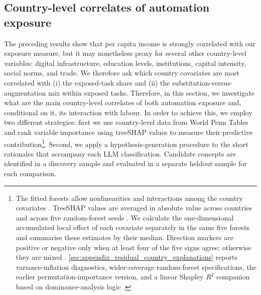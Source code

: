 \documentclass[11pt]{article}
\begin{document}
\FloatBarrier
\subsection{Country-level correlates of automation exposure}
\label{sec:results_country_predictors}


The preceding results show that per capita income is strongly correlated with our exposure measure, but it may nonetheless proxy for several other country-level variables: digital infrastructure, education levels, institutions, capital intensity, social norms, and trade. We therefore ask which country covariates are most correlated with (i) the exposed-task share and (ii) the substitution-versus-augmentation mix within exposed tasks. Therefore, in this section, we investigate what are the main country-level correlates of both automation exposure and, conditional on it, its interaction with labour. In order to achieve this, we employ two different strategies: first we use country-level data from World Penn Tables \citep{FeenstraInklaarTimmer2015PWT} and rank variable importance using treeSHAP values \citep{LundbergLee2017SHAP,LundbergEtAl2020TreeSHAP} to measure their predictive contribution\footnote{The fitted forests allow nonlinearities and interactions among the country covariates \citep{Breiman2001RandomForests}. TreeSHAP values are averaged in absolute value across countries and across five random-forest seeds \citep{LundbergLee2017SHAP,LundbergEtAl2020TreeSHAP}. We calculate the one-dimensional accumulated local effect of each covariate separately in the same five forests and summarise these estimates by their median. Direction markers are positive or negative only when at least four of the five signs agree; otherwise they are mixed \citep{ApleyZhu2020ALE}. \ref{sec:appendix_residual_country_explanations} reports variance-inflation diagnostics, wider-coverage random-forest specifications, the earlier permutation-importance version, and a linear Shapley $R^2$ companion based on dominance-analysis logic \citep{Budescu1993DominanceAnalysis}.}. Second, we apply a hypothesis-generation procedure \citep{GentzkowKellyTaddy2019,LudwigMullainathan2024HypothesisGeneration,MovvaEtAl2025HypotheSAEs} to the short rationales that accompany each LLM classification. Candidate concepts are identified in a discovery sample and evaluated in a separate heldout sample for each comparison.
\end{document}

